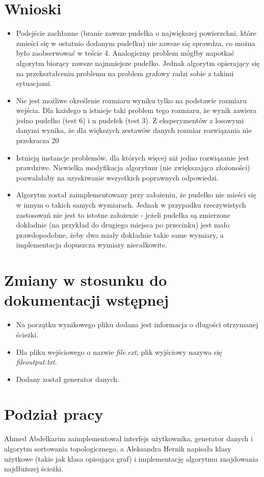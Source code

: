 \documentclass{article}
\begin{document}
\section{Wnioski}
\begin{itemize}
\item Podejście zachłanne (branie zawsze pudełka o największej powierzchni, które zmieści się w ostatnio dodanym pudełku) nie zawsze się sprawdza, co można było zaobserwować w teście 4. Analogiczny problem mógłby napotkać algorytm biorący zawsze najmniejsze pudełko. Jednak algorytm opierający się na przekształceniu problemu na problem grafowy radzi sobie z takimi sytuacjami.
\item Nie jest możliwe określenie rozmiaru wyniku tylko na podstawie rozmiaru wejścia. Dla każdego n istnieje taki problem tego rozmiaru, że wynik zawiera jedno pudełko (test 6) i n pudełek (test 3). Z eksperymentów z losowymi danymi wynika, że dla większych zestawów danych rozmiar rozwiązania nie przekracza 20%
\item Istnieją instancje problemów, dla których więcej niż jedno rozwiązanie jest prawdziwe. Niewielka modyfikacja algorytmu (nie zwiększająca złożoności) pozwalałaby na uzyskiwanie wszystkich poprawnych odpowiedzi.
\item Algorytm został zaimplementowany przy założeniu, że pudełko nie mieści się w innym o takich samych wymiarach. Jednak w przypadku rzeczywistych zastosowań nie jest to istotne założenie - jeżeli pudełka są zmierzone dokładnie (na przykład do drugiego miejsca po przecinku) jest mało prawdopodobne, żeby dwa miały dokładnie takie same wymiary, a implementacja dopuszcza wymiary niecałkowite. 
\end{itemize}

\section{Zmiany w stosunku do dokumentacji wstępnej}
\begin{itemize}
\item Na początku wynikowego pliku dodana jest informacja o długości otrzymanej ścieżki.
\item Dla pliku wejściowego o nazwie \textit{file.ext}, plik wyjściowy nazywa się \textit{file\textunderscore output.txt}.
\item Dodany został generator danych.
\end{itemize}

\section{Podział pracy}
Ahmed Abdelkarim zaimplementował interfejs użytkownika, generator danych i algorytm sortowania topologicznego, a Aleksandra Hernik napisała klasy użytkowe (takie jak klasa opisująca graf) i implementację algorytmu znajdowania najdłuższej ścieżki.
\end{document}

